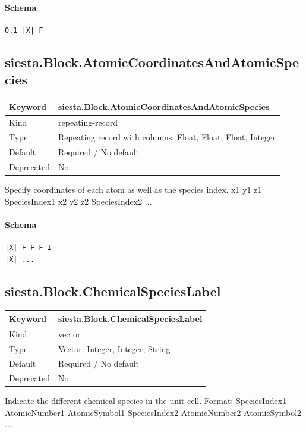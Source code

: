 \documentclass[11pt]{article}
\begin{document}
{{{{{\paragraph{Schema}
\begin{Verbatim}
0.1 |X| F
\end{Verbatim}

\subsection{siesta.Block.AtomicCoordinatesAndAtomicSpecies}
\label{kw:siesta-Block-AtomicCoordinatesAndAtomicSpecies}
\begin{longtable}{|p{1.5in}|p{4.5in}|}
\hline
Keyword & siesta.Block.AtomicCoordinatesAndAtomicSpecies \\
\hline
Kind & repeating-record \\
\hline
Type & Repeating record with columns: Float, Float, Float, Integer \\
\hline
Default & Required / No default \\
\hline
Deprecated & No \\
\hline
\end{longtable}
 Specify coordinates of each atom as well as the species index.
 x1 y1 z1 SpeciesIndex1
 x2 y2 z2 SpeciesIndex2
 ...

\paragraph{Schema}
\begin{Verbatim}
|X| F F F I
|X| ...
\end{Verbatim}

\subsection{siesta.Block.ChemicalSpeciesLabel}
\label{kw:siesta-Block-ChemicalSpeciesLabel}
\begin{longtable}{|p{1.5in}|p{4.5in}|}
\hline
Keyword & siesta.Block.ChemicalSpeciesLabel \\
\hline
Kind & vector \\
\hline
Type & Vector: Integer, Integer, String \\
\hline
Default & Required / No default \\
\hline
Deprecated & No \\
\hline
\end{longtable}
 Indicate the different chemical species in the unit cell.
 Format:
 SpeciesIndex1 AtomicNumber1 AtomicSymbol1
 SpeciesIndex2 AtomicNumber2 AtomicSymbol2
 ...

}}}}}
\end{document}
